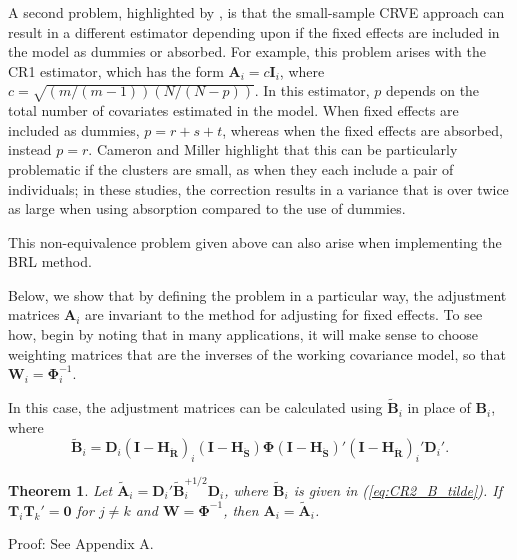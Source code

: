 \documentclass[12pt]{article}\usepackage[]{graphicx}\usepackage[]{color}
\newtheorem{thm}{Theorem}
\newcommand{\bm}{\mathbf}
\newcommand{\bs}{\boldsymbol}
\begin{document}
A second problem, highlighted by \citet{Cameron2015practitioners}, is that the small-sample CRVE approach can result in a different estimator depending upon if the fixed effects are included in the model as dummies or absorbed. 
For example, this problem arises with the CR1 estimator, which has the form $\bm{A}_i = c\bm{I}_i$, where $c = \sqrt{(m/(m-1))(N/(N - p))}$. In this estimator, $p$ depends on the total number of covariates estimated in the model.
When fixed effects are included as dummies, $p = r + s + t$, whereas when the fixed effects are absorbed, instead $p = r$. 
Cameron and Miller highlight that this can be particularly problematic if the clusters are small, as when they each include a pair of individuals; in these studies, the correction results in a variance that is over twice as large when using absorption compared to the use of dummies.

This non-equivalence problem given above can also arise when implementing the BRL method.

Below, we show that by defining the problem in a particular way, the adjustment matrices $\bm{A}_i$ are invariant to the method for adjusting for fixed effects.
To see how, begin by noting that in many applications, it will make sense to choose weighting matrices that are the inverses of the working covariance model, so that $\bm{W}_i = \bs\Phi_i^{-1}$. 

In this case, the adjustment matrices can be calculated using $\bm{\tilde{B}}_i$ in place of $\bm{B}_i$, where
\begin{equation}
\label{eq:CR2_B_tilde}
\bm{\tilde{B}}_i = \bm{D}_i\left(\bm{I} - \bm{H_{\ddot{R}}}\right)_i \left(\bm{I} - \bm{H_{\ddot{S}}}\right) \bs\Phi \left(\bm{I} - \bm{H_{\ddot{S}}}\right)' \left(\bm{I} - \bm{H_{\ddot{R}}}\right)_i' \bm{D}_i'.
\end{equation}

\begin{thm}
\label{thm:absorb}
Let $\bm{\tilde{A}}_i = \bm{D}_i'\bm{\tilde{B}}_i^{+1/2} \bm{D}_i$, where $\bm{\tilde{B}}_i$ is given in (\ref{eq:CR2_B_tilde}). If $\bm{T}_i \bm{T}_k' = \bm{0}$ for $j \neq k$ and $\bm{W} = \bs\Phi^{-1}$, then $\bm{A}_i = \bm{\tilde{A}}_i$. 
\end{thm}
Proof: See Appendix A.

\end{document}
